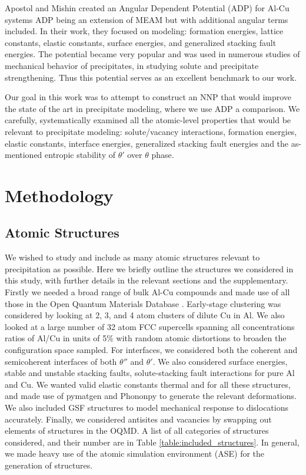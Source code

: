 \documentclass{article}
\begin{document}
Apostol and Mishin created an Angular Dependent Potential (ADP) for Al-Cu systems\cite{Apostol2011} ADP being an extension of MEAM but with additional angular terms included.
In their work, they focused on modeling: formation energies, lattice constants, elastic constants, surface energies, and generalized stacking fault energies.
The potential became very popular and was used in numerous studies of mechanical behavior of precipitates,
in studying solute and precipitate strengthening\cite{Singh2013AnAlloy}\cite{Esteban-Manzanares2019}\cite{Wu2020AtomisticAlloys}. Thus this potential serves as an excellent benchmark to our work. 

Our goal in this work was to attempt to construct an NNP that would improve the state of the art in precipitate modeling, where we use ADP a comparison.
We carefully, systematically examined all the atomic-level properties that would be relevant to precipitate modeling: solute/vacancy interactions, formation energies, elastic constants, interface energies, generalized stacking fault energies and the as-mentioned entropic stability of $\theta'$ over $\theta$ phase.


\section{Methodology}
\subsection{Atomic Structures}
We wished to study and include as many atomic structures relevant to precipitation as possible.
 Here we briefly outline the structures we considered in this study, with further details in the relevant sections and the supplementary.  
Firstly we needed a broad range of bulk Al-Cu compounds and made use of all those in the Open Quantum Materials Database \cite{Kirklin2015}.
Early-stage clustering was considered by looking at 2, 3, and 4 atom clusters of dilute Cu in Al. We also looked at a large number of 32 atom FCC supercells spanning all concentrations ratios of Al/Cu in units of 5\% 
with random atomic distortions to broaden the configuration space sampled.  For interfaces, we considered both the coherent and semicoherent interfaces of both $\theta''$ and $\theta'$.  We also considered surface energies,  stable and unstable stacking faults, solute-stacking fault interactions for pure Al and Cu.
We wanted valid elastic constants thermal and for all these structures, and made use of pymatgen\cite{Ong2013} and Phononpy\cite{Togo2015FirstScience} to generate the relevant deformations.
We also included GSF structures to model mechanical response to dislocations accurately. Finally, we considered
antisites and vacancies by swapping out elements of structures in the OQMD. A list of all categories of structures considered, and their number are in Table \ref{table:included_structures}.
In general, we made heavy use of the atomic simulation environment (ASE) for the generation of structures\cite{HjorthLarsen2017}.
\end{document}
